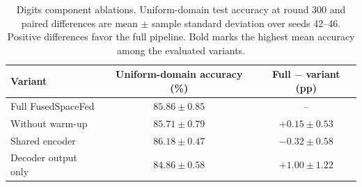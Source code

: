 \begin{table}[t]
\coauthorcolor
\centering
\small
\setlength{\tabcolsep}{15pt}
\caption{Digits component ablations. Uniform-domain test accuracy at round 300 and paired differences are mean $\pm$ sample standard deviation over seeds 42--46. Positive differences favor the full pipeline. Bold marks the highest mean accuracy among the evaluated variants.}
\label{tab:digits_ablation}
\begin{tabular}{lcc}
\toprule
Variant & Uniform-domain accuracy (\%) & Full $-$ variant (pp) \\
\midrule
Full FusedSpaceFed & $85.86\pm0.85$ & -- \\
Without warm-up & $85.71\pm0.79$ & $+0.15\pm0.53$ \\
Shared encoder & $\boldsymbol{86.18\pm0.47}$ & $-0.32\pm0.58$ \\
Decoder output only & $84.86\pm0.58$ & $+1.00\pm1.22$ \\
\bottomrule
\end{tabular}
\end{table}
